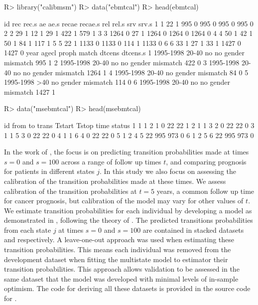 \documentclass[article,shortnames]{jss}
\begin{document}
\begin{Schunk}
\begin{Sinput}
R> library("calibmsm")
R> data("ebmtcal")
R> head(ebmtcal)
\end{Sinput}
\begin{Soutput}
  id  rec rec.s   ae ae.s recae recae.s  rel rel.s  srv srv.s
1  1   22     1  995    0   995       0  995     0  995     0
2  2   29     1   12    1    29       1  422     1  579     1
3  3 1264     0   27    1  1264       0 1264     0 1264     0
4  4   50     1   42    1    50       1   84     1  117     1
5  5   22     1 1133    0  1133       0  114     1 1133     0
6  6   33     1   27    1    33       1 1427     0 1427     0
       year agecl proph              match dtcens dtcens.s
1 1995-1998 20-40    no no gender mismatch    995        1
2 1995-1998 20-40    no no gender mismatch    422        0
3 1995-1998 20-40    no no gender mismatch   1264        1
4 1995-1998 20-40    no    gender mismatch     84        0
5 1995-1998   >40    no    gender mismatch    114        0
6 1995-1998 20-40    no no gender mismatch   1427        1
\end{Soutput}
\begin{Sinput}
R> data("msebmtcal")
R> head(msebmtcal)
\end{Sinput}
\begin{Soutput}
  id from to trans Tstart Tstop time status
1  1    1  2     1      0    22   22      1
2  1    1  3     2      0    22   22      0
3  1    1  5     3      0    22   22      0
4  1    1  6     4      0    22   22      0
5  1    2  4     5     22   995  973      0
6  1    2  5     6     22   995  973      0
\end{Soutput}
\end{Schunk}

In the work of \cite{DeWreede2011}, the focus is on predicting transition probabilities made at times $s = 0$ and $s = 100$ across a range of follow up times $t$, and comparing prognosis for patients in different states $j$. In this study we also focus on assessing the calibration of the transition probabilities made at these times. We assess calibration of the transition probabilities at $t = 5$ years, a common follow up time for cancer prognosis, but calibration of the model may vary for other values of $t$. We estimate transition probabilities for each individual by developing a model as demonstrated in \cite{DeWreede2011}, following the theory of \cite{Putter2007}. The predicted transitions probabilities from each state $j$ at times $s = 0$ and $s = 100$ are contained in stacked datasets  and  respectively. A leave-one-out approach was used when estimating these transition probabilities. This means each individual was removed from the development dataset when fitting the multistate model to estimator their transition probabilities. This approach allows validation to be assessed in the same dataset that the model was developed with minimal levels of in-sample optimism. The code for deriving all these datasets is provided in the source code for .
\end{document}
